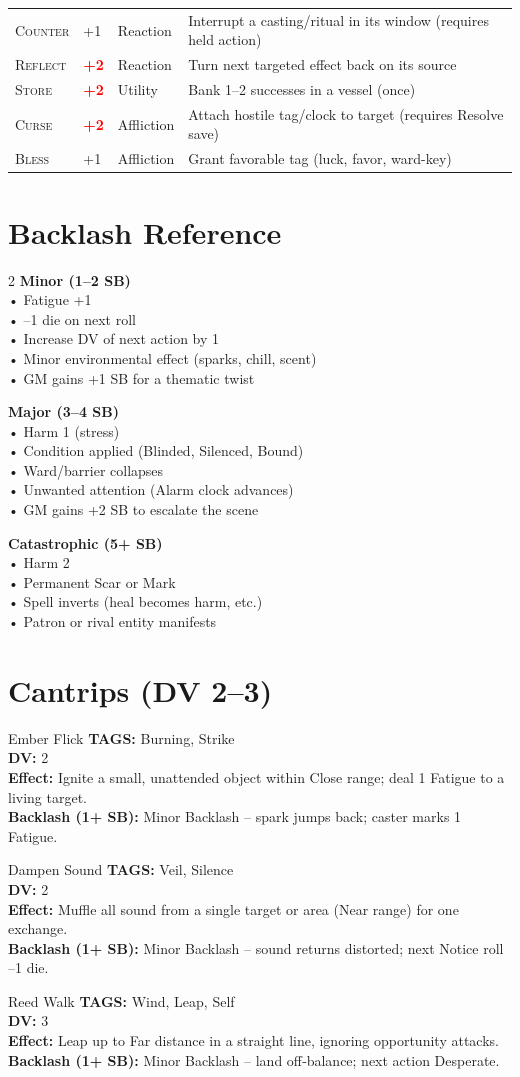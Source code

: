 \documentclass[10pt,a5paper]{book}
\newcommand{\spell}[5]{ %
    \begin{spellcard}{#1}
    \textbf{TAGS:} #2 \\
    \textbf{DV:} #3 \\
    \textbf{Effect:} #4 \\
    \textbf{Backlash (1+ SB):} #5
    \end{spellcard}
    \vspace{0.5cm}
}
\newcommand{\dangerous}[1]{\textcolor{red}{\textbf{#1}}}
\newcommand{\tag}[1]{\textsc{#1}}
\begin{document}
\begin{longtable}{@{} p{2.5cm} p{1.2cm} p{2.5cm} p{6cm} @{}}
\tag{Counter} & +1 & Reaction & Interrupt a casting/ritual in its window (requires held action) \\
\tag{Reflect} & \dangerous{+2} & Reaction & Turn next targeted effect back on its source \\
\tag{Store} & \dangerous{+2} & Utility & Bank 1–2 successes in a vessel (once) \\
\tag{Curse} & \dangerous{+2} & Affliction & Attach hostile tag/clock to target (requires Resolve save) \\
\tag{Bless} & +1 & Affliction & Grant favorable tag (luck, favor, ward-key) \\
\bottomrule
\end{longtable}

\section{Backlash Reference}
\begin{tcolorbox}[colback=red!5, colframe=red!50]
\begin{multicols}{2}
\textbf{Minor (1–2 SB)} \\
• Fatigue +1 \\
• –1 die on next roll \\
• Increase DV of next action by 1 \\
• Minor environmental effect (sparks, chill, scent) \\
• GM gains +1 SB for a thematic twist

\textbf{Major (3–4 SB)} \\
• Harm 1 (stress) \\
• Condition applied (Blinded, Silenced, Bound) \\
• Ward/barrier collapses \\
• Unwanted attention (Alarm clock advances) \\
• GM gains +2 SB to escalate the scene

\textbf{Catastrophic (5+ SB)} \\
• Harm 2 \\
• Permanent Scar or Mark \\
• Spell inverts (heal becomes harm, etc.) \\
• Patron or rival entity manifests \\
\end{multicols}
\end{tcolorbox}

\newpage
\section{Cantrips (DV 2–3)}
\spell{Ember Flick}{Burning, Strike}{2}{Ignite a small, unattended object within Close range; deal 1 Fatigue to a living target.}{Minor Backlash – spark jumps back; caster marks 1 Fatigue.}
\spell{Dampen Sound}{Veil, Silence}{2}{Muffle all sound from a single target or area (Near range) for one exchange.}{Minor Backlash – sound returns distorted; next Notice roll –1 die.}
\spell{Reed Walk}{Wind, Leap, Self}{3}{Leap up to Far distance in a straight line, ignoring opportunity attacks.}{Minor Backlash – land off‑balance; next action Desperate.}
\end{document}

